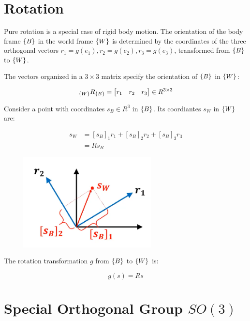 \section{Rotation}

Pure rotation is a special case of rigid body motion. The orientation of the body frame $\{B\}$ in the world frame $\{W\}$ is determined by the coordinates of the three orthogonal vectors $r_1 = g(e_1), r_2 = g(e_2), r_3 = g(e_3)$, transformed from $\{B\}$ to $\{W\}$.

The vectors organized in a $3\times 3$ matrix specify the orientation of $\{B\}$ in $\{W\}$:

\begin{equation*}
    {}_{\{W\}}R_{\{B\}} = \begin{bmatrix}
        r_1 & r_2 & r_3
    \end{bmatrix} \in R^{3\times 3}
\end{equation*}

Consider a point with coordinates $s_B\in R^3$ in $\{B\}$. Its coordiantes $s_W$ in $\{W\}$ are:

\begin{equation*}
    \begin{split}
        s_W &= [s_B]_1r_1 + [s_B]_2r_2 + [s_B]_3r_3 \\
        &= Rs_B
    \end{split}
\end{equation*}

\begin{figure}[h]\centering\includegraphics[width=7cm]{img/j_3_2.png}\end{figure}

The rotation transformation $g$ from $\{B\}$ to $\{W\}$ is:

\begin{equation*}
    g(s) = Rs
\end{equation*}

\section{Special Orthogonal Group $SO(3)$}

